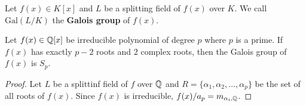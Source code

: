 \begin{definition}
  Let $f(x) \in K[x]$ and $L$ be a splitting field of $f(x)$ over $K$. We call $\text{Gal}(L/K)$
  the {\bf Galois group} of $f(x)$.
\end{definition}

\begin{prop}
  Let $f(x) \in \mathbb{Q}[x]$ be irreducible polynomial of degree $p$ where $p$ is a prime.
  If $f(x)$ has exactly $p-2$ roots and $2$ complex roots, then the Galois group of $f(x)$ is $S_p$.

  \begin{proof}
    Let $L$ be a splittinf field of $f$ over $\mathbb{Q}$ and $R = \{ \alpha_1, \alpha_2, \dots, \alpha_p \}$ be
    the set of all roots of $f(x)$. Since $f(x)$ is irreducible, $f(x) / a_p = m_{\alpha_i, \mathbb{Q}}$.
  \end{proof}
\end{prop}
